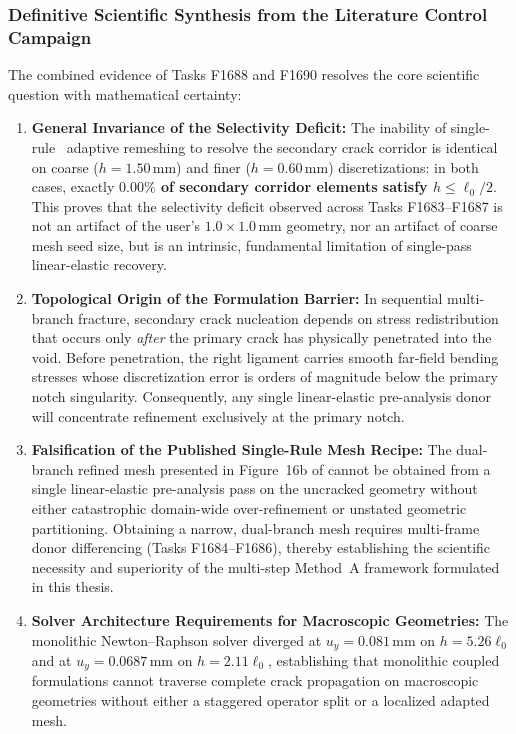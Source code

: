 \subsubsection{Definitive Scientific Synthesis from the Literature Control Campaign}
The combined evidence of Tasks F1688 and F1690 resolves the core scientific question with mathematical certainty:
\begin{enumerate}
  \item \textbf{General Invariance of the Selectivity Deficit:} The inability of single-rule \MISESERI\ adaptive remeshing to resolve the secondary crack corridor is identical on coarse ($h = 1.50\,\mathrm{mm}$) and finer ($h = 0.60\,\mathrm{mm}$) discretizations: in both cases, exactly \textbf{$0.00\%$ of secondary corridor elements satisfy $h \le \ell_0/2$}. This proves that the selectivity deficit observed across Tasks F1683--F1687 is not an artifact of the user's $1.0 \times 1.0\,\mathrm{mm}$ geometry, nor an artifact of coarse mesh seed size, but is an intrinsic, fundamental limitation of single-pass linear-elastic recovery.
  \item \textbf{Topological Origin of the Formulation Barrier:} In sequential multi-branch fracture, secondary crack nucleation depends on stress redistribution that occurs only \emph{after} the primary crack has physically penetrated into the void. Before penetration, the right ligament carries smooth far-field bending stresses whose discretization error is orders of magnitude below the primary notch singularity. Consequently, any single linear-elastic pre-analysis donor will concentrate refinement exclusively at the primary notch.
  \item \textbf{Falsification of the Published Single-Rule Mesh Recipe:} The dual-branch refined mesh presented in Figure~16b of \citet{pandey2025} cannot be obtained from a single linear-elastic pre-analysis pass on the uncracked geometry without either catastrophic domain-wide over-refinement or unstated geometric partitioning. Obtaining a narrow, dual-branch mesh requires multi-frame donor differencing (Tasks F1684--F1686), thereby establishing the scientific necessity and superiority of the multi-step Method~A framework formulated in this thesis.
  \item \textbf{Solver Architecture Requirements for Macroscopic Geometries:} The monolithic Newton--Raphson solver diverged at $u_y = 0.081\,\mathrm{mm}$ on $h = 5.26\ell_0$ and at $u_y = 0.0687\,\mathrm{mm}$ on $h = 2.11\ell_0$, establishing that monolithic coupled formulations cannot traverse complete crack propagation on macroscopic geometries without either a staggered operator split or a localized adapted mesh.
\end{enumerate}


